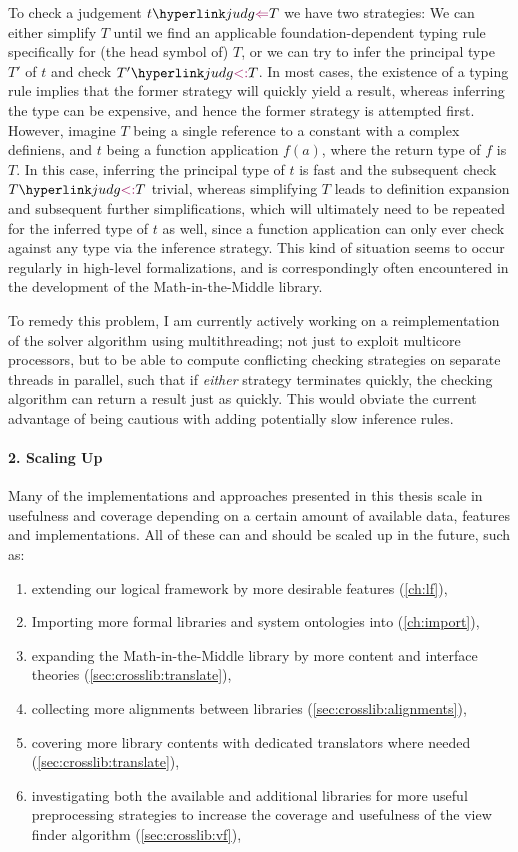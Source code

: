 \begin{enumerate}
	To check a judgement $\hastype tT$ we have two strategies: We can either simplify $T$ until we find an applicable foundation-dependent typing rule specifically for (the head symbol of) $T$, or we can try to infer the principal type $T'$ of $t$ and check $\subtp {T'}T$. In most cases, the existence of a typing rule implies that the former strategy will quickly yield a result, whereas inferring the type can be expensive, and hence the former strategy is attempted first. However, imagine $T$ being a single reference to a constant with a complex definiens, and $t$ being a function application $f(a)$, where the return type of $f$ is $T$. In this case, inferring the principal type of $t$ is fast and the subsequent check $\subtp TT$ trivial, whereas simplifying $T$ leads to definition expansion and subsequent further simplifications, which will ultimately need to be repeated for the inferred type of $t$ as well, since a function application can only ever check against any type via the inference strategy. This kind of situation seems to occur regularly in high-level formalizations, and is correspondingly often encountered in the development of the Math-in-the-Middle library.
	
	To remedy this problem, I am currently actively working on a reimplementation of the \mmt solver algorithm using multithreading; not just to exploit multicore processors, but to be able to compute conflicting checking strategies on separate threads in parallel, such that if \emph{either} strategy terminates quickly, the checking algorithm can return a result just as quickly. This would obviate the current advantage of being cautious with adding potentially slow inference rules.
\end{enumerate}

\paragraph{2. Scaling Up} Many of the implementations and approaches presented in this thesis scale in usefulness and coverage depending on a certain amount of available data, features and implementations. All of these can and should be scaled up in the future, such as:
\begin{enumerate}
	\item extending our logical framework by more desirable features (\autoref{ch:lf}),
	\item Importing more formal libraries and system ontologies into \ommt (\autoref{ch:import}),
	\item expanding the Math-in-the-Middle library by more content and interface theories (\autoref{sec:crosslib:translate}),
	\item collecting more alignments between libraries (\autoref{sec:crosslib:alignments}),
	\item covering more library contents with dedicated translators where needed (\autoref{sec:crosslib:translate}),
	\item investigating both the available and additional libraries for more useful preprocessing strategies to increase the coverage and usefulness of the view finder algorithm (\autoref{sec:crosslib:vf}),
\end{enumerate}

